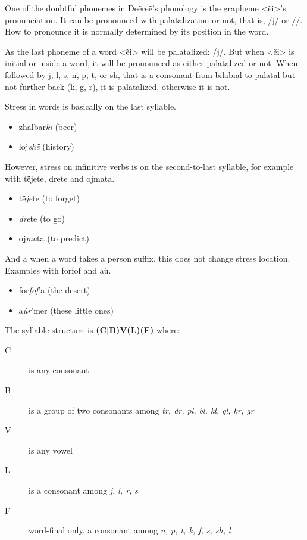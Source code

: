 One of the doubtful phonemes in Deẽreẽ’s phonology is the grapheme <ẽi>’s pronunciation. It can be
pronounced with palatalization or not, that is, /{\ipaET}j/ or /\ipaET/. How to pronounce it is
normally determined by its position in the word.

As the last phoneme of a word <ẽi> will be palatalized: /{\ipaET}j/. But when <ẽi> is initial or
inside a word, it will be pronounced as either palatalized or not. When followed by j, l, s, n, p,
t, or sh, that is a consonant from bilabial to palatal but not further back (k, g, r), it is
palatalized, otherwise it is not.

Stress in words is basically on the last syllable.
\begin{itemize}
\item zhalbar\emph{ki} (beer)
\item loj\emph{shë} (history)
\end{itemize}

However, stress on infinitive verbs is on the second-to-last syllable, for example with
\gls{tëjete}, \gls{drete} and \gls{ojmata}.
\begin{itemize}
\item të\emph{je}te (to forget)
\item \emph{dre}te (to go)
\item oj\emph{ma}ta (to predict)
\end{itemize}

And a when a word takes a person suffix, this does not change stress location. Examples with
\gls{forfof} and \gls{aù}.
\begin{itemize}
\item for\emph{fof}’a (the desert)
\item a\emph{ùr}’mer (these little ones)
\end{itemize}

The syllable structure is \textbf{(C|B)V(L)(F)} where:
\begin{description}
\item[C] is any consonant
\item[B] is a group of two consonants among \emph{tr, dr, pl, bl, kl, gl, kr, gr}
\item[V] is any vowel
\item[L] is a consonant among \emph{j, l, r, s}
\item[F] word-final only, a consonant among \emph{n, p, t, k, f, s, sh, l}
\end{description}

